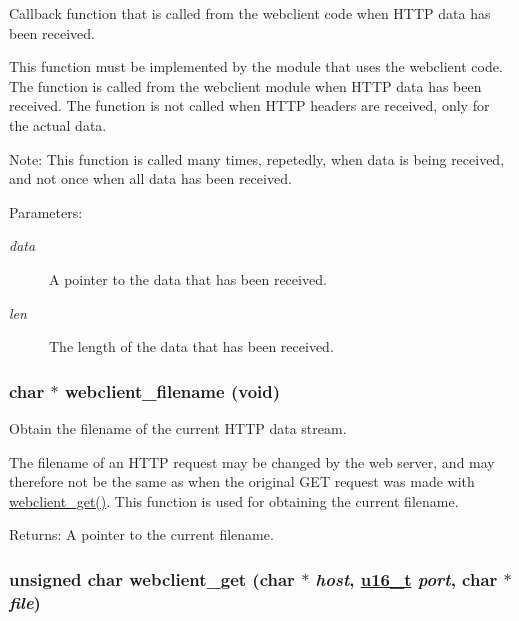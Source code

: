 Callback function that is called from the webclient code when HTTP data has been received. 

This function must be implemented by the module that uses the webclient code. The function is called from the webclient module when HTTP data has been received. The function is not called when HTTP headers are received, only for the actual data.

\begin{Desc}
\item[Note:]This function is called many times, repetedly, when data is being received, and not once when all data has been received.\end{Desc}
\begin{Desc}
\item[Parameters:]
\begin{description}
\item[{\em data}]A pointer to the data that has been received. \item[{\em len}]The length of the data that has been received. \end{description}
\end{Desc}
\hypertarget{a00079_g41e616d3fcc17e0aabfe8ab45ef0d30f}{
\subsubsection[webclient\_\-filename]{\setlength{\rightskip}{0pt plus 5cm}char $\ast$ webclient\_\-filename (void)}}
\label{a00079_g41e616d3fcc17e0aabfe8ab45ef0d30f}


Obtain the filename of the current HTTP data stream. 

The filename of an HTTP request may be changed by the web server, and may therefore not be the same as when the original GET request was made with \hyperlink{a00079_gf9385ef9ecc74c7d53ff2f15e62bfde3}{webclient\_\-get()}. This function is used for obtaining the current filename.

\begin{Desc}
\item[Returns:]A pointer to the current filename. \end{Desc}
\hypertarget{a00079_gf9385ef9ecc74c7d53ff2f15e62bfde3}{
\subsubsection[webclient\_\-get]{\setlength{\rightskip}{0pt plus 5cm}unsigned char webclient\_\-get (char $\ast$ {\em host}, \hyperlink{a00070_gfc6499c1f28697aa3bfc2804d496fd11}{u16\_\-t} {\em port}, char $\ast$ {\em file})}}
\label{a00079_gf9385ef9ecc74c7d53ff2f15e62bfde3}


